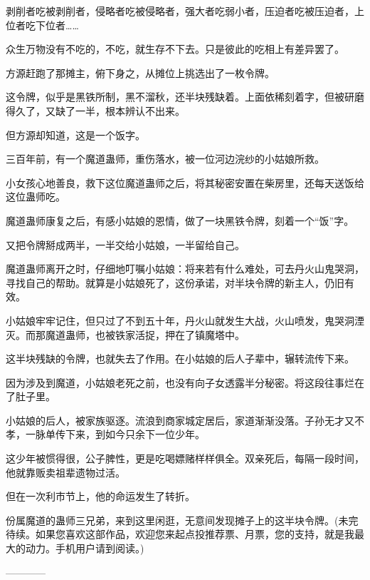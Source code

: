\begin{this_body}
剥削者吃被剥削者，侵略者吃被侵略者，强大者吃弱小者，压迫者吃被压迫者，上位者吃下位者……

众生万物没有不吃的，不吃，就生存不下去。只是彼此的吃相上有差异罢了。

方源赶跑了那摊主，俯下身之，从摊位上挑选出了一枚令牌。

这令牌，似乎是黑铁所制，黑不溜秋，还半块残缺着。上面依稀刻着字，但被研磨得久了，又缺了一半，根本辨认不出来。

但方源却知道，这是一个饭字。

三百年前，有一个魔道蛊师，重伤落水，被一位河边浣纱的小姑娘所救。

小女孩心地善良，救下这位魔道蛊师之后，将其秘密安置在柴房里，还每天送饭给这位蛊师吃。

魔道蛊师康复之后，有感小姑娘的恩情，做了一块黑铁令牌，刻着一个“饭”字。

又把令牌掰成两半，一半交给小姑娘，一半留给自己。

魔道蛊师离开之时，仔细地叮嘱小姑娘：将来若有什么难处，可去丹火山鬼哭洞，寻找自己的帮助。就算是小姑娘死了，这份承诺，对半块令牌的新主人，仍旧有效。

小姑娘牢牢记住，但只过了不到五十年，丹火山就发生大战，火山喷发，鬼哭洞湮灭。而那魔道蛊师，也被铁家活捉，押在了镇魔塔中。

这半块残缺的令牌，也就失去了作用。在小姑娘的后人子辈中，辗转流传下来。

因为涉及到魔道，小姑娘老死之前，也没有向子女透露半分秘密。将这段往事烂在了肚子里。

小姑娘的后人，被家族驱逐。流浪到商家城定居后，家道渐渐没落。子孙无才又不孝，一脉单传下来，到如今只余下一位少年。

这少年被惯得很，公子脾性，更是吃喝嫖赌样样俱全。双亲死后，每隔一段时间，他就靠贩卖祖辈遗物过活。

但在一次利市节上，他的命运发生了转折。

份属魔道的蛊师三兄弟，来到这里闲逛，无意间发现摊子上的这半块令牌。(未完待续。如果您喜欢这部作品，欢迎您来起点投推荐票、月票，您的支持，就是我最大的动力。手机用户请到阅读。)

------------

\end{this_body}

